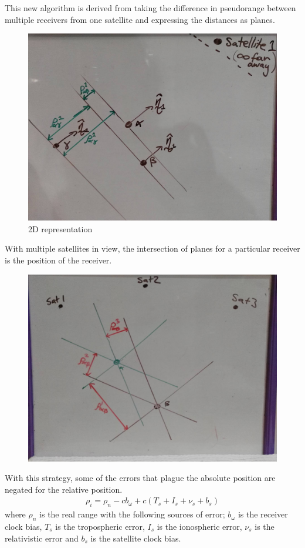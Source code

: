 This new algorithm is derived from taking the difference in pseudorange between multiple receivers from one satellite and expressing the distances as planes.
\begin{figure}[h]
\centering
\caption{2D representation}
\label{fig:overall_singleS_multiR}
\includegraphics[width=0.7\linewidth]{ChapterLiteratureReview/overall_singleS_multiR.jpg}
\end{figure}

With multiple satellites in view, the intersection of planes for a particular receiver is the position of the receiver.
\begin{figure}[h]
\centering
\caption{}
\label{fig:overall_multiS_duelR}
\includegraphics[width=0.7\linewidth]{ChapterLiteratureReview/overall_multiS_duelR.jpg}
\end{figure}

With this strategy, some of the errors that plague the absolute position are negated for the relative position. 
\begin{eqnarray}
\rho_i = \rho_n -cb_\omega + c(T_s + I_s+\nu_s+b_s)
\end{eqnarray}
where $\rho_n$ is the real range with the following sources of error; $b_\omega$ is the receiver clock bias, $T_s$ is the tropospheric error, $I_s$ is the ionospheric error, $\nu_s$ is the relativistic error and $b_s$ is the satellite clock bias.




